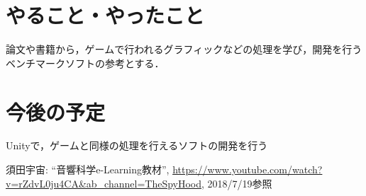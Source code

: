 \documentclass[twocolumn,10pt,a4j]{ltjsarticle}
\begin{document}
\section{やること・やったこと}

論文や書籍から，ゲームで行われるグラフィックなどの処理を学び，開発を行うベンチマークソフトの参考とする．


\section{今後の予定}
Unityで，ゲームと同様の処理を行えるソフトの開発を行う

\begin{thebibliography}{99}
 須田宇宙: ``音響科学e-Learning教材'', \url{https://www.youtube.com/watch?v=rZdvL0ju4CA&ab_channel=TheSpyHood}, 2018/7/19参照
\end{thebibliography}
\end{document}
